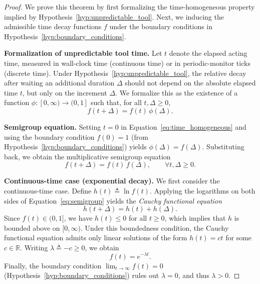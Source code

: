 \begin{proof}
We prove this theorem by first formalizing the time-homogeneous property implied by
Hypothesis~\ref{hyp:unpredictable_tool}. Next, we inducing the admissible time decay functions $f$ under the boundary conditions in
Hypothesis~\ref{hyp:boundary_conditions}.
\smallskip

\noindent\textbf{Formalization of unpredictable tool time.} Let $t$ denote the elapsed acting time, measured in wall-clock time (continuous time) or in periodic-monitor ticks (discrete time). Under Hypothesis~\ref{hyp:unpredictable_tool}, the relative decay after waiting an additional duration $\Delta$ should not depend on the absolute elapsed time $t$, but only on the increment $\Delta$. We formalize this as the existence of a function $\phi:[0,\infty)\to(0,1]$ such that, for all $t,\Delta\ge 0$, \begin{equation} f(t+\Delta)=f(t)\,\phi(\Delta). \label{eq:time_homogeneous} \end{equation}

\noindent\textbf{Semigroup equation.} Setting $t=0$ in Equation~\ref{eq:time_homogeneous} and using the boundary condition $f(0)=1$
(from Hypothesis~\ref{hyp:boundary_conditions}) yields
$\phi(\Delta)=f(\Delta)$. Substituting back, we obtain the multiplicative
semigroup equation
\begin{equation}
f(t+\Delta)=f(t)\,f(\Delta),\qquad \forall t,\Delta\ge 0.
\label{eq:semigroup}
\end{equation}

\noindent \textbf{Continuous-time case (exponential decay).} We first consider the continuous-time case.
Define $h(t)\triangleq \ln f(t)$. Applying the logarithms on both sides of
Equation~\ref{eq:semigroup} yields the \emph{Cauchy functional equation}
\begin{equation}
h(t+\Delta)=h(t)+h(\Delta).
\label{eq:cauchy}
\end{equation}
Since $f(t)\in(0,1]$, we have $h(t)\le 0$ for all $t\ge 0$, which implies
that $h$ is bounded above on $[0,\infty)$. Under this boundedness condition, the Cauchy functional equation admits only linear solutions
of the form $h(t)=ct$ for some $c\in\mathbb{R}$. Writing $\lambda\triangleq -c\ge 0$,
we obtain
\begin{equation}
f(t)=e^{-\lambda t}.
\label{eq:exp_decay}
\end{equation}
Finally, the boundary condition $\lim_{t\to\infty} f(t)=0$
(Hypothesis~\ref{hyp:boundary_conditions}) rules out $\lambda=0$,
and thus $\lambda>0$.


\end{proof}
